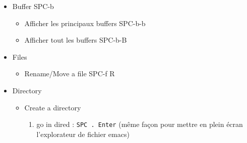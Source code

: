 \documentclass{article}
\begin{document}
\begin{itemize}
\begin{itemize}
\begin{itemize}
\item S-right \#shift right
\item S-left
\end{itemize}
\item Changing priority
\label{sec:org79706a0}
\begin{itemize}
\item S-up \#shift up
\item S-down
\end{itemize}
\item Tags
\label{sec:org5f38573}
Define a tag with :1tag:2tag:
\begin{itemize}
\item Open tags manager
\label{sec:org193c0ae}
\begin{itemize}
\item SPC m q
\end{itemize}
\end{itemize}
\item Time
\label{sec:orge3e94f0}
\begin{itemize}
\item SPC m d
\end{itemize}
\item Scheduled
\label{sec:org61dd509}
\begin{itemize}
\item SPC m d s
\end{itemize}
\end{itemize}
\item Buffer
\label{sec:org3e4e5ff}
SPC-b
\begin{itemize}
\item Afficher les principaux buffers
\label{sec:org650b3db}
SPC-b-b
\item Afficher tout les  buffers
\label{sec:org1b5c2fe}
SPC-b-B
\end{itemize}
\item Files
\label{sec:org26ef4fb}
\begin{itemize}
\item Rename/Move a file
\label{sec:org66afbe9}
SPC-f R
\end{itemize}
\item Directory
\label{sec:orgdcec273}
\begin{itemize}
\item Create a directory
\label{sec:orgf69f17a}
\begin{enumerate}
\item go in dired : \texttt{SPC . Enter} (même façon pour mettre en plein écran l'explorateur de fichier emacs)

\end{enumerate}
\end{itemize}
\end{itemize}
\end{document}
